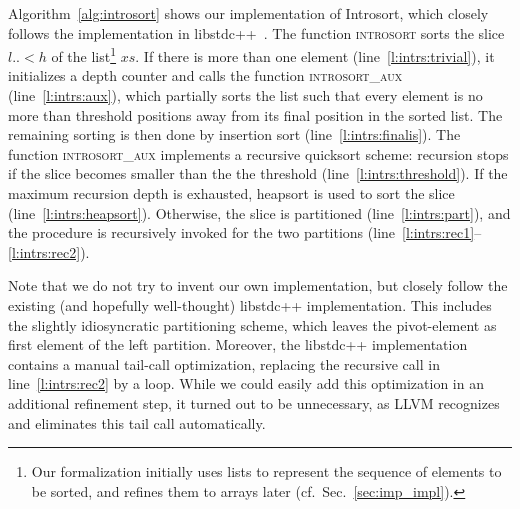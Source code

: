 \documentclass[runningheads]{llncs}
\begin{document}
  Algorithm~\ref{alg:introsort} shows our implementation of Introsort, which closely follows the implementation in libstdc++~\cite{libstdc++}.
  The function \textsc{introsort} sorts the slice \is$l..<h$ of the list\footnote{%
    Our formalization initially uses lists to represent the sequence of elements to be sorted, and refines them to arrays later (cf.\ Sec.\ \ref{sec:imp_impl}).
  } $xs$.
  If there is more than one element (line~\ref{l:intrs:trivial}), it initializes a depth
  counter and calls the function \textsc{introsort\_aux} (line~\ref{l:intrs:aux}), which partially sorts the list such that every element is no more than
  threshold positions away from its final position in the sorted list. The remaining sorting is then done by insertion sort (line~\ref{l:intrs:finalis}).
  The function \textsc{introsort\_aux} implements a recursive quicksort scheme: recursion stops if the slice becomes smaller than the the threshold (line~\ref{l:intrs:threshold}).
  If the maximum recursion depth is exhausted, heapsort is used to sort the slice (line~\ref{l:intrs:heapsort}).
  Otherwise, the slice is partitioned (line~\ref{l:intrs:part}), and the procedure is
  recursively invoked for the two partitions (line~\ref{l:intrs:rec1}--\ref{l:intrs:rec2}).

  Note that we do not try to invent our own implementation, but closely follow the existing (and hopefully well-thought) libstdc++ implementation.
  This includes the slightly idiosyncratic partitioning scheme, which leaves the pivot-element as first element of the left partition.
  Moreover, the libstdc++ implementation contains a manual tail-call optimization, replacing the recursive call in line~\ref{l:intrs:rec2} by a loop.
  While we could easily add this optimization in an additional refinement step, it turned out to be unnecessary, as LLVM recognizes and
  eliminates this tail call automatically.
\end{document}
